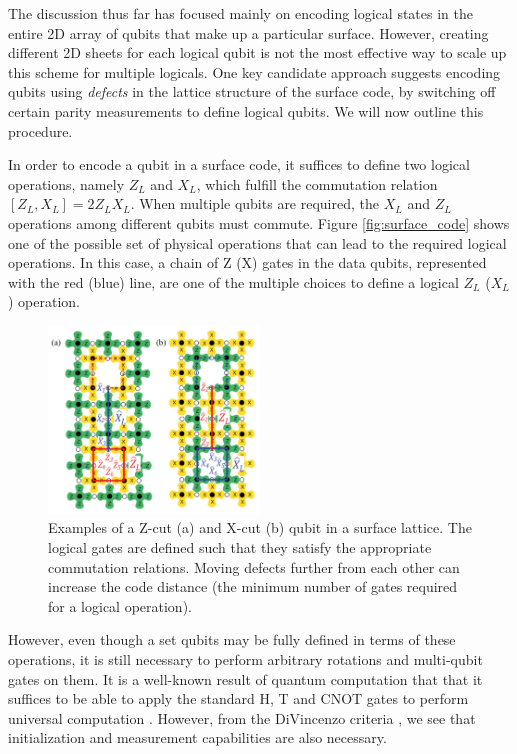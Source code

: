 The discussion thus far has focused mainly on encoding logical states in the
entire 2D array of qubits that make up a particular surface. However, creating
different 2D sheets for each logical qubit is not the most effective way to
scale up this scheme for multiple logicals. One key candidate approach suggests
encoding qubits using \textit{defects} in the lattice structure of the surface
code, by switching off certain parity measurements to define logical qubits. We
will now outline this procedure.

In order to encode a qubit in a surface code, it suffices to define two logical
operations, namely $Z_L$ and $X_L$, which fulfill the commutation relation
$[Z_L,X_L] = 2Z_LX_L$. When multiple qubits are required, the $X_L$ and $Z_L$
operations among different qubits must commute. Figure \ref{fig:surface_code}
shows one of the possible set of physical operations that can lead to the
required logical operations. In this case, a chain of Z (X) gates in the data
qubits, represented with the red (blue) line, are one of the multiple choices to
define a logical $Z_L$ ($X_L$) operation.

\begin{figure}[htbp]
  \centering
  \includegraphics[width=0.5\textwidth]{images/surface_code_cuts.pdf}
  \caption{Examples of a Z-cut (a) and X-cut (b) qubit in a surface lattice. The
    logical gates are defined such that they satisfy the appropriate commutation
    relations. Moving defects further from each other can increase the code
    distance (the minimum number of gates required for a logical operation).}
  \label{fig:cuts}
\end{figure}

However, even though a set qubits may be fully defined in terms of these
operations, it is still necessary to perform arbitrary rotations and multi-qubit
gates on them. It is a well-known result of quantum computation that that it
suffices to be able to apply the standard H, T and CNOT gates to perform
universal computation \cite{nielsen_chuang_2010}. However, from the DiVincenzo
criteria \cite{DiCincenzoCriteria}, we see that initialization and
measurement capabilities are also necessary.

